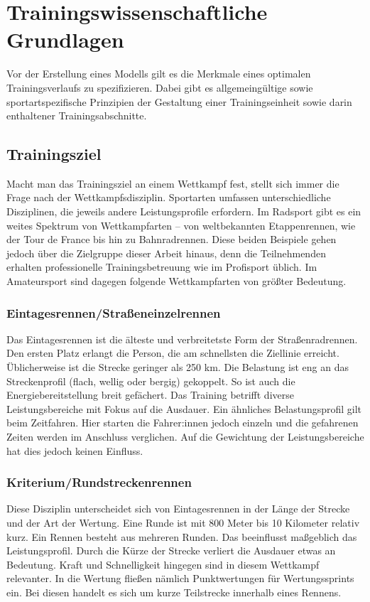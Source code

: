 \chapter{Trainingswissenschaftliche Grundlagen}
\label{sec:grundlagen:rad}
Vor der Erstellung eines Modells gilt es die Merkmale eines optimalen Trainingsverlaufs zu spezifizieren. Dabei gibt es allgemeingültige sowie sportartspezifische Prinzipien der Gestaltung einer Trainingseinheit sowie darin enthaltener Trainingsabschnitte.

\section{Trainingsziel}
Macht man das Trainingsziel an einem Wettkampf fest, stellt sich immer die Frage nach der Wettkampfsdisziplin. Sportarten umfassen unterschiedliche Disziplinen, die jeweils andere Leistungsprofile erfordern. Im Radsport gibt es ein weites Spektrum von Wettkampfarten -- von weltbekannten Etappenrennen, wie der Tour de France bis hin zu Bahnradrennen. Diese beiden Beispiele gehen jedoch über die Zielgruppe dieser Arbeit hinaus, denn die Teilnehmenden erhalten professionelle Trainingsbetreuung wie im Profisport üblich. Im Amateursport sind dagegen folgende Wettkampfarten von größter Bedeutung.
\subsection{Eintagesrennen/Straßeneinzelrennen}
\label{eintagesrennen}
Das Eintagesrennen ist die älteste und verbreitetste Form der Straßenradrennen. Den ersten Platz erlangt die Person, die am schnellsten die Ziellinie erreicht.
Üblicherweise ist die Strecke geringer als 250 km. Die Belastung ist eng an das Streckenprofil (flach, wellig oder bergig) gekoppelt. So ist auch die Energiebereitstellung breit gefächert. Das Training betrifft diverse Leistungsbereiche mit Fokus auf die Ausdauer.
Ein ähnliches Belastungsprofil gilt beim Zeitfahren. Hier starten die Fahrer:innen jedoch einzeln und die gefahrenen Zeiten werden im Anschluss verglichen. Auf die Gewichtung der Leistungsbereiche hat dies jedoch keinen Einfluss. 
\subsection{Kriterium/Rundstreckenrennen}
Diese Disziplin unterscheidet sich von Eintagesrennen in der Länge der Strecke und der Art der Wertung. Eine Runde ist mit 800 Meter bis 10 Kilometer relativ kurz. Ein Rennen besteht aus mehreren Runden. 
Das beeinflusst maßgeblich das Leistungsprofil. Durch die Kürze der Strecke verliert die Ausdauer etwas an Bedeutung. Kraft und Schnelligkeit hingegen sind in diesem Wettkampf relevanter. In die Wertung fließen nämlich Punktwertungen für Wertungssprints ein. Bei diesen handelt es sich um kurze Teilstrecke innerhalb eines Rennens. 
